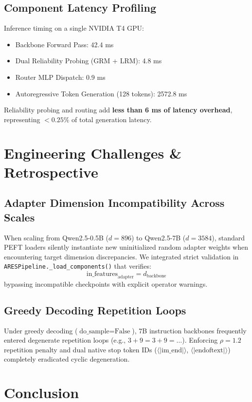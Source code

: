 \documentclass[journal,10pt,twocolumn]{IEEEtran}
\begin{document}
\subsection{Component Latency Profiling}
Inference timing on a single NVIDIA T4 GPU:
\begin{itemize}
    \item Backbone Forward Pass: 42.4 ms
    \item Dual Reliability Probing (GRM + LRM): 4.8 ms
    \item Router MLP Dispatch: 0.9 ms
    \item Autoregressive Token Generation (128 tokens): 2572.8 ms
\end{itemize}
Reliability probing and routing add \textbf{less than 6 ms of latency overhead}, representing $< 0.25\%$ of total generation latency.

\section{Engineering Challenges \& Retrospective}
\label{sec:engineering}

\subsection{Adapter Dimension Incompatibility Across Scales}
When scaling from Qwen2.5-0.5B ($d=896$) to Qwen2.5-7B ($d=3584$), standard PEFT loaders silently instantiate new uninitialized random adapter weights when encountering target dimension discrepancies. We integrated strict validation in \texttt{ARESPipeline.\_load\_components()} that verifies:
\begin{equation}
\text{in\_features}_{\text{adapter}} = d_{\text{backbone}}
\end{equation}
bypassing incompatible checkpoints with explicit operator warnings.

\subsection{Greedy Decoding Repetition Loops}
Under greedy decoding ($\text{do\_sample} = \text{False}$), 7B instruction backbones frequently entered degenerate repetition loops (e.g., $3+9 = 3+9 = \dots$). Enforcing $\rho = 1.2$ repetition penalty and dual native stop token IDs ($\langle|\text{im\_end}|\rangle$, $\langle|\text{endoftext}|\rangle$) completely eradicated cyclic degeneration.

\section{Conclusion}
\end{document}
